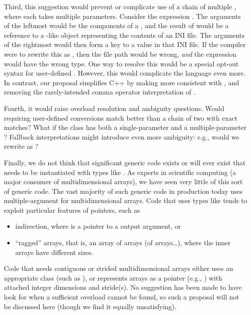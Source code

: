 \documentclass{wg21}
\begin{document}
Third, this suggestion would prevent or complicate use of a chain of multiple , where each  takes multiple parameters.  Consider the expression .  The arguments of the leftmost  would be the components of a , and the result of  would be a reference to a -like object representing the contents of an INI file.  The arguments of the rightmost  would then form a key to a value in that INI file.  If the compiler were to rewrite this as , then the file path would be wrong, \emph{and} the expression would have the wrong type.  One way to resolve this would be a special opt-out syntax for user-defined .  However, this would complicate the language even more.  In contrast, our proposal simplifies C++ by making  more consistent with , and removing the rarely-intended comma operator interpretation of .

Fourth, it would raise overload resolution and ambiguity questions.  Would  requiring user-defined conversions match better than a chain of two  with exact matches?  What if the class has both a single-parameter and a multiple-parameter ?  Fallback interpretations might introduce even more ambiguity: e.g., would we rewrite  as ?  

Finally, we do not think that significant generic code exists or will ever exist that needs to be instantiated with types like .  As experts in scientific computing (a major consumer of multidimensional arrays), we have seen very little of this sort of generic code.  The vast majority of such generic code in production today uses multiple-argument  for multidimensional arrays.  Code that uses types like  tends to exploit particular features of pointers, such as
\begin{itemize}
\item indirection, where  is a pointer to a  output argument, or
\item ``ragged'' arrays, that is, an array of arrays (of arrays\ldots), where the inner arrays have different sizes.
\end{itemize}
Code that needs contiguous or strided multidimensional arrays either uses an appropriate class (such as ), or represents arrays as a pointer (e.g., ) with attached integer dimensions and stride(s).  No suggestion has been made to have  look for  when a sufficient  overload cannot be found, so such a proposal will not be discussed here (though we find it equally unsatisfying).
\end{document}
